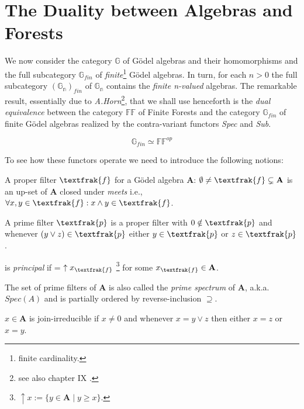 \newpage
\section{The Duality between Algebras and Forests}

We now consider the category $\mathbb{G}$ of Gödel algebras and their homomorphisms and the full subcategory $\mathbb{G}_{fin}$ of \emph{finite}\footnote{finite cardinality.} Gödel algebras. In turn, for each $ n>0 $ the full subcategory $(\mathbb{G_n})_{fin}$ of $\mathbb{G_n}$ contains the \emph{finite n-valued} algebras. \newline
The remarkable result, essentially due to \emph{A.Horn}\footnote{see also chapter IX \cite{fuzzy}.}, that we shall use henceforth is the \emph{dual equivalence} between the category $\mathbb{FF}$ of Finite Forests and the category $\mathbb{G}_{fin}$ of finite Gödel algebras realized by the contra-variant functors \emph{Spec} and \emph{Sub}.

\begin{thm}
	\[ \mathbb{G}_{fin} \simeq \mathbb{FF}^{\textit{op}} \]
\end{thm}

To see how these functors operate we need to introduce the following notions:
\begin{definition}
	A proper filter $\textfrak{f}$ for a Gödel algebra $\mathbf{A}$: $\emptyset \neq \textfrak{f} \subsetneq \mathbf{A}$ is an up-set of $\mathbf{A}$ closed under \emph{meets} i.e.,  $\forall x,y \in \textfrak{f}: x \land y \in \textfrak{f}$.
\end{definition}
\begin{definition}
	A prime filter $\textfrak{p}$ is a proper filter with $0 \notin \textfrak{p}$ and whenever $ (y \lor z) \in \textfrak{p} $ either $y \in \textfrak{p}$ or $z \in \textfrak{p}$. 
\end{definition}
\begin{definition}
	 is \emph{principal} if  = $\uparrow x_\textfrak{f}$ \footnote{$\uparrow x := \{y \in \mathbf{A} \;|\; y \geq x\}$.} for some $x_\textfrak{f} \in \textbf{A}$.
\end{definition}
\begin{definition}
	 The set of prime filters of $\mathbf{A}$ is also called the \emph{prime spectrum} of $\mathbf{A}$, a.k.a. $Spec(A)$ and is partially ordered by reverse-inclusion $\supseteq$.
\end{definition}
\begin{definition}
	$x \in \mathbf{A} $ is join-irreducible if $x \neq 0$ and whenever $ x= y \lor z $ then either $x=z$ or $x=y$.
\end{definition}

